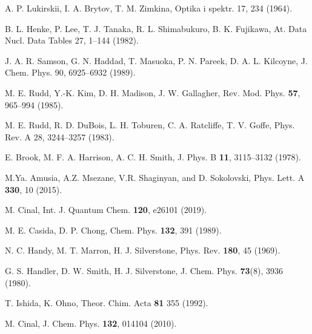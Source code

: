 \begin{thebibliography}{9}
A. P. Lukirskii, I. A. Brytov, T. M. Zimkina, 
Optika i spektr. 17, 234 (1964).

B. L. Henke, P. Lee, T. J. Tanaka, R. L. Shimabukuro, B. K. Fujikawa, 
At. Data Nucl. Data Tables 27, 1--144 (1982).

J. A. R. Samson, G. N. Haddad, T. Masuoka, P. N. Pareek, 
D. A. L. Kilcoyne, 
J. Chem. Phys. 90, 6925--6932 (1989).


M. E. Rudd, Y.-K. Kim, D. H. Madison, J. W. Gallagher, 
Rev. Mod. Phys. \textbf{57}, 965--994 (1985).

M. E. Rudd, R. D. DuBois, L. H. Toburen, C. A. Ratcliffe, T. V. Goffe, 
Phys. Rev. A 28, 3244--3257 (1983).

E. Brook, M. F. A. Harrison, A. C. H. Smith, 
J. Phys. B \textbf{11}, 3115--3132 (1978).


M.Ya. Amusia, A.Z. Msezane, V.R. Shaginyan, and D. Sokolovski, 
Phys. Lett. A {\bf 330}, 10 (2015).


M. Cinal,
Int. J. Quantum Chem. \textbf{120}, e26101 (2019).

M. E. Casida, D. P. Chong, 
Chem. Phys. \textbf{132}, 391 (1989).


N. C. Handy, M. T. Marron, H. J. Silverstone, 
Phys. Rev. \textbf{180}, 45 (1969).

G. S. Handler, D. W. Smith, H. J. Silverstone, 
J. Chem. Phys. \textbf{73}(8), 3936 (1980).

T. Ishida, K. Ohno, 
Theor. Chim. Acta \textbf{81} 355 (1992).

M. Cinal,
J. Chem. Phys. \textbf{132}, 014104 (2010).


\end{thebibliography}
